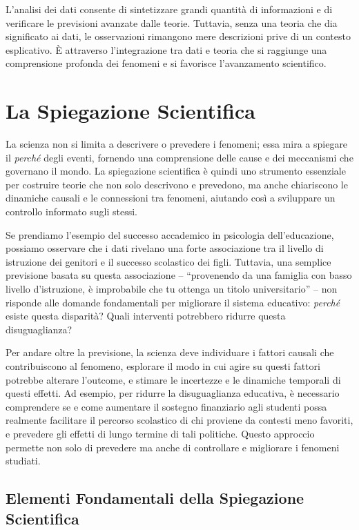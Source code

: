 \documentclass[
  letterpaper,
  DIV=11,
  numbers=noendperiod]{scrreprt}
\theoremstyle{definition}
\theoremstyle{remark}
\begin{document}
L'analisi dei dati consente di sintetizzare grandi quantità di
informazioni e di verificare le previsioni avanzate dalle teorie.
Tuttavia, senza una teoria che dia significato ai dati, le osservazioni
rimangono mere descrizioni prive di un contesto esplicativo. È
attraverso l'integrazione tra dati e teoria che si raggiunge una
comprensione profonda dei fenomeni e si favorisce l'avanzamento
scientifico.

\section{La Spiegazione Scientifica}\label{la-spiegazione-scientifica}

La scienza non si limita a descrivere o prevedere i fenomeni; essa mira
a spiegare il \emph{perché} degli eventi, fornendo una comprensione
delle cause e dei meccanismi che governano il mondo. La spiegazione
scientifica è quindi uno strumento essenziale per costruire teorie che
non solo descrivono e prevedono, ma anche chiariscono le dinamiche
causali e le connessioni tra fenomeni, aiutando così a sviluppare un
controllo informato sugli stessi.

Se prendiamo l'esempio del successo accademico in psicologia
dell'educazione, possiamo osservare che i dati rivelano una forte
associazione tra il livello di istruzione dei genitori e il successo
scolastico dei figli. Tuttavia, una semplice previsione basata su questa
associazione -- ``provenendo da una famiglia con basso livello
d'istruzione, è improbabile che tu ottenga un titolo universitario'' --
non risponde alle domande fondamentali per migliorare il sistema
educativo: \emph{perché} esiste questa disparità? Quali interventi
potrebbero ridurre questa disuguaglianza?

Per andare oltre la previsione, la scienza deve individuare i fattori
causali che contribuiscono al fenomeno, esplorare il modo in cui agire
su questi fattori potrebbe alterare l'outcome, e stimare le incertezze e
le dinamiche temporali di questi effetti. Ad esempio, per ridurre la
disuguaglianza educativa, è necessario comprendere se e come aumentare
il sostegno finanziario agli studenti possa realmente facilitare il
percorso scolastico di chi proviene da contesti meno favoriti, e
prevedere gli effetti di lungo termine di tali politiche. Questo
approccio permette non solo di prevedere ma anche di controllare e
migliorare i fenomeni studiati.

\subsection{Elementi Fondamentali della Spiegazione
Scientifica}\label{elementi-fondamentali-della-spiegazione-scientifica}
\end{document}
